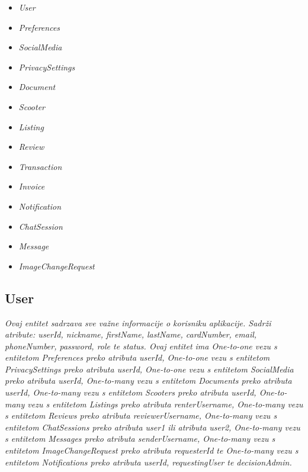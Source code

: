 	\begin{itemize}
		\item 	\textit{User}
		\item 	\textit{Preferences}
		\item 	\textit{SocialMedia}
		\item 	\textit{PrivacySettings}
		\item 	\textit{Document}
		\item 	\textit{Scooter}
		\item 	\textit{Listing}
		\item 	\textit{Review}
		\item 	\textit{Transaction}
		\item 	\textit{Invoice}
		\item 	\textit{Notification}
		\item 	\textit{ChatSession}
		\item 	\textit{Message}
		\item 	\textit{ImageChangeRequest}
	\end{itemize}


\subsection{User}


\textit{Ovaj entitet sadrzava sve važne informacije o korisniku aplikacije. Sadrži atribute: userId, nickname, firstName, lastName, cardNumber, email, phoneNumber, password, role te status. Ovaj entitet ima One-to-one vezu s entitetom Preferences preko atributa userId, One-to-one vezu s entitetom PrivacySettings preko atributa userId, One-to-one vezu s entitetom SocialMedia preko atributa userId, One-to-many vezu s entitetom Documents preko atributa userId, One-to-many vezu s entitetom Scooters preko atributa userId, One-to-many vezu s entitetom Listings preko atributa renterUsername, One-to-many vezu s entitetom Reviews preko atributa reviewerUsername, One-to-many vezu s entitetom ChatSessions preko atributa user1 ili atributa user2, One-to-many vezu s entitetom Messages preko atributa senderUsername, One-to-many vezu s entitetom ImageChangeRequest preko atributa requesterId te One-to-many vezu s entitetom Notifications preko atributa userId, requestingUser te decisionAdmin.}


